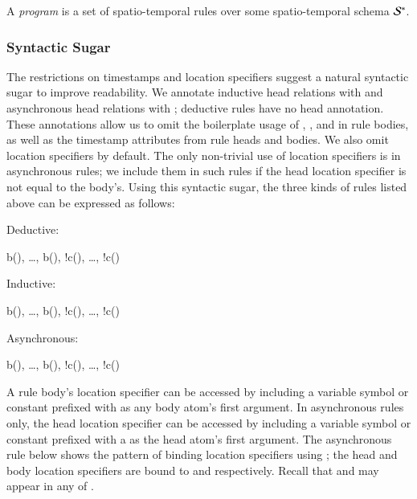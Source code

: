 A \lang \emph{program} is a set of spatio-temporal rules over some
spatio-temporal schema $\stschema$.  

\subsubsection{Syntactic Sugar}
The restrictions on timestamps and location specifiers suggest a natural
syntactic sugar to improve readability.  We annotate inductive head relations
with  and asynchronous head relations with ;
deductive rules have no head annotation.  These annotations allow us to omit the
boilerplate usage of , ,  and
 in rule bodies, as well as the timestamp attributes from rule
heads and bodies.  We also omit location specifiers by default. The only
non-trivial use of location specifiers is in asynchronous rules; we include them
in such rules if the head location specifier is not equal to the body's. Using
this syntactic sugar, the three kinds of rules listed above can be expressed as
follows:

Deductive:

\begin{Drules}
        {b(), \ldots, b(), !c(), \ldots, !c()}
\end{Drules}

Inductive:

\begin{Drules}
        {b(), \ldots, b(), !c(), \ldots, !c()}
\end{Drules}

Asynchronous:

\begin{Drules}
        {b(), \ldots, b(), !c(), \ldots, !c()}
\end{Drules}

A rule body's location specifier can be accessed by including a variable symbol
or constant prefixed with \dedalus{#} as any body atom's first argument.  In
asynchronous rules only, the head location specifier can be accessed by
including a variable symbol or constant prefixed with a \dedalus{#} as the head
atom's first argument.  The asynchronous rule below shows the pattern of binding location specifiers using \dedalus{#}; the
head and body location specifiers are bound to  and  respectively.
Recall that  and  may appear in any of .

